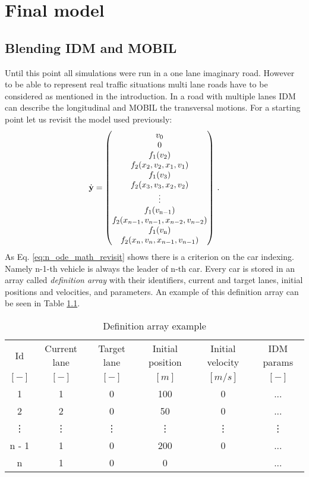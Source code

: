\chapter{Final model}
	\section{Blending IDM and MOBIL}
		Until this point all simulations were run in a one lane imaginary road. However to be able to represent real traffic situations multi lane roads have to be considered as mentioned in the introduction. In a road with multiple lanes IDM can describe the longitudinal and MOBIL the transversal motions. For a starting point let us revisit the model used previously:
		\begin{equation}
			\dot{\textbf{y}}=
			\begin{pmatrix}
			v_0\\
			0\\
			f_1(v_{2})\\
			f_2(x_{2}, v_{2},x_{1}, v_{1})\\
			f_1(v_{3})\\
			f_2(x_{3}, v_{3},x_{2}, v_{2})\\
			\vdots\\
			f_1(v_{\rm n-1})\\
			f_2(x_{n-1}, v_{n-1},x_{n-2}, v_{n-2})\\
			f_1(v_{\rm n})\\
			f_2(x_{n}, v_{n},x_{n-1}, v_{n-1})
			\end{pmatrix}\,.
			\label{eq:n_ode_math_revisit}
		\end{equation}
		As Eq. \eqref{eq:n_ode_math_revisit} shows there is a criterion on the car indexing. Namely n-1-th vehicle is always the leader of n-th car. Every car is stored in an array called \textit{definition array} with their identifiers, current and target lanes, initial positions and velocities, and parameters. An example of this definition array can be seen in Table \ref{tab:definition_array}.
		\begin{table}
			\begin{center}
				\begin{tabular}{ |c|c|c|c|c|c| }
					\hline
					Id & Current lane & Target lane & Initial position & Initial velocity& IDM params\\
					$[-]$ & $[-]$ & $[-]$ & $[m]$ & $[m/s]$ & $[-]$\\
					\hline
					1 & 1 & 0 & 100 & 0 & ...\\
					2 & 2 & 0 & 50 & 0 & ...\\
					\vdots & \vdots & \vdots & \vdots & \vdots & \vdots\\
					n - 1 & 1 & 0 & 200 & 0 & ...\\
					n & 1 & 0 & 0 & & ...\\
					\hline
				\end{tabular}
			\end{center}
			\caption{Definition array example}
			\label{tab:definition_array}
		\end{table}
